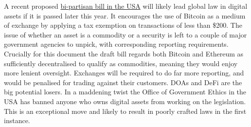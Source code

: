 A recent proposed \href{https://bitcoinmagazine.com/business/heres-whats-in-senator-lummis-bitcoin-bill}{bi-partisan bill in the USA} will likely lead global law in digital assets if it is passed later this year. It encourages the use of Bitcoin as a medium of exchange by applying a tax exemption on transactions of less than \$200. The issue of whether an asset is a commodity or a security is left to a couple of major government agencies to unpick, with corresponding reporting requirements. Crucially for this document the draft bill regards both Bitcoin and Ethereum as sufficiently decentralised to qualify as commodities, meaning they would enjoy more lenient oversight. Exchanges will be required to do far more reporting, and would be penalised for trading against their customers. DOAs and DeFi are the big potential losers. In a maddening twist the Office of Government Ethics in the USA has banned anyone who owns digital assets from working on the legislation. This is an exceptional move and likely to result in poorly crafted laws in the first instance.
